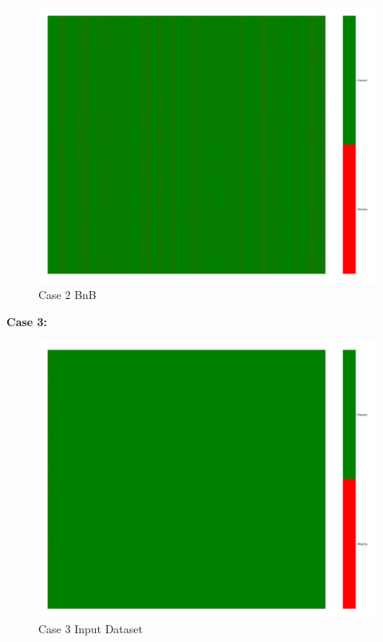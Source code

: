 \documentclass[a4paper,12pt]{article}
\begin{document}
\begin{figure}[H]
    \includegraphics[width=\linewidth]{case2_bnb_heatmap_cleaned.png}
    \caption*{Case 2 BnB}
\end{figure}

\textbf{Case 3:}
\begin{figure}[H]
    \centering
    \includegraphics[width=\linewidth]{case3_heatmap_erased.png}
    \caption*{Case 3 Input Dataset}
\end{figure}
\end{document}
